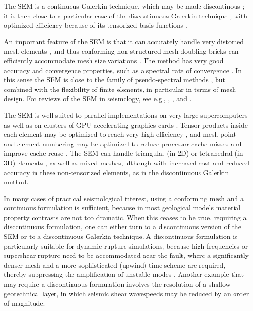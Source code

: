 \documentclass[referee,extra]{gji}
\renewcommand{\cite}[1]{\citet{#1}}
\begin{document}
The SEM is a continuous Galerkin technique, which may be made discontinous \citep{BeMaPa94,Ch00,KoWoHu02,ChCaVi03,LaWaBe05,Kop06,WiStBuGh10,AcKo11};
it is then close to a particular case of the discontinuous Galerkin technique \citep{ReHi73,Arn82,FaRi99,HuHuRa99,CoKaSh00,GiHeWa02,RiWh03,MoRi05,GrScSc06,AiMoMu06,BeLaPi06,DuKa06,DeSeWh08,PuAmKa09,WiStBuGh10,DeSe10,EtChViGl10},
with optimized efficiency because of its tensorized basis functions \citep{WiStBuGh10,AcKo11}.

An important feature of the SEM is that it can accurately handle very distorted mesh elements \citep{OlSe11},
and thus conforming non-structured mesh doubling bricks can efficiently accommodate mesh size variations
\citep{KoTr02a,KoLiTrSuStSh04,LeChLiKoHuTr08,LeChKoHuTr09,LeKoHuTr09}.
The method has very good accuracy and convergence properties, such as a spectral rate of convergence
 \citep{CaHuQuZa88,MaPa89,SePr94,DeFiMu02,Coh02,DeSe07,SeOl08}.
In this sense the SEM is close to the family of pseudo-spectral methods
\citep[see e.g.,][]{CaHuQuZa88,CaKoKo88,CaKoBeSe92,CaWa93,KoCoMo96},
but combined with the flexibility of finite elements, in particular in terms of mesh design.
For reviews of the SEM in seismology, see e.g., \citet{KoTsTr05}, \cite{ChKoViCaVaFe07}, \cite{TrKoLi08} and \cite{Fi11}.

The SEM is well suited to parallel implementations on very large supercomputers \citep{KoTr02a,KoTsChTr03,TsKoChTr03,KoLaMi08a,CaKoLaTiMiLeSnTr08,KoViCh10}
as well as on clusters of GPU accelerating graphics cards \citep{KoMiEr09,KoErGoMi10,Kom11}.
Tensor products inside each element may be optimized to reach very high efficiency \citep{DeFiMu02},
and mesh point and element numbering may be optimized to reduce processor cache misses
and improve cache reuse \citep{KoLaMi08a}.
The SEM can handle triangular (in 2D) or tetrahedral (in 3D) elements \citep{WinBoyd96,TaWi00,KoMaTrTaWi01,Coh02,MeViSa06},
as well as mixed meshes, although with increased cost and reduced accuracy in these non-tensorized elements,
as in the discontinuous Galerkin method.

In many cases of practical seismological interest,
using a conforming mesh and a continuous formulation is sufficient,
because in most geological models material property contrasts are not too dramatic.
When this ceases to be true, requiring a discontinuous formulation, one can either turn
to a discontinuous version of the SEM \citep{BeMaPa94,Ch00,KoWoHu02,ChCaVi03,LaWaBe05,Kop06,WiStBuGh10,AcKo11}
or to a discontinuous Galerkin technique.
A discontinuous formulation is particularly suitable for dynamic rupture simulations,
because high frequencies or supershear rupture need to be accommodated near the fault,
where a significantly denser mesh and a more sophisticated (upwind) time scheme are required,
thereby suppressing the amplification of unstable modes
\citep[see e.g.,][]{BeGlCrViPi07,PuAmKa09,BeGlCrVi09,TaCrEtViBeSa10}.
Another example that may require a discontinuous formulation involves the resolution of a shallow geotechnical layer,
in which seismic shear wavespeeds may be reduced by an order of magnitude.
\end{document}
